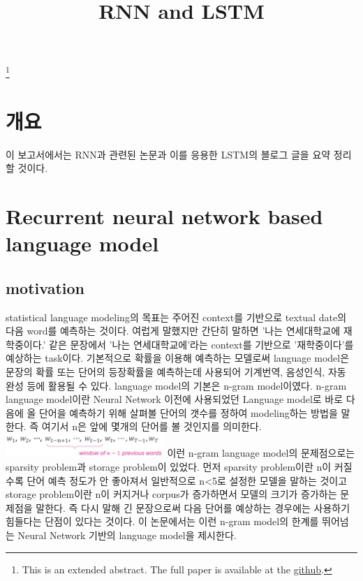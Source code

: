 \documentclass[extendedabs]{bmvc2k}
\begin{document}
\title{RNN and LSTM}
\maketitle
\let\thefootnote\relax\footnote{This is an extended abstract. The full paper is available at the \href{https://github.com/LeeGwanHui/TIL/tree/main/deeplearning_ham}{github}. }
\vspace{-0.2in}
\section{개요}
 \quad 이 보고서에서는 RNN과 관련된 논문과 이를 응용한 LSTM의 블로그 글을 요약 정리할 것이다.

 \section{Recurrent neural network based language model\cite{mikolov2010recurrent}}
 \subsection{motivation}
 \quad statistical language modeling의 목표는 주어진 context를 기반으로 textual date의 다음 word를 예측하는 것이다. 
 여럽게 말했지만 간단히 말하면 '나는 연세대학교에 재학중이다.' 같은 문장에서 '나는 연세대학교에'라는 context를 기반으로 '재학중이다'를 예상하는 task이다.
 기본적으로 확률을 이용해 예측하는 모델로써 language model은 문장의 확률 또는 단어의 등장확률을 예측하는데 사용되어
 기계번역, 음성인식, 자동 완성 등에 활용될 수 있다. \cite{youtube} language model의 기본은 n-gram model이였다. 
 n-gram language model이란 Neural Network 이전에 사용되었던 Language model로 바로 다음에 올 단어을 예측하기 위해 살펴볼 
 단어의 갯수를 정하여 modeling하는 방법을 말한다. 즉 여기서 n은 앞에 몇개의 단어를 볼 것인지를 의미한다.
 \newline  \includegraphics[width=6cm]{images/06_language.PNG}
 \newline 이런 n-gram language model의 문제점으로는 sparsity problem과 storage problem이 있었다. 먼저 sparsity problem이란 
 n이 커질수록 단어 예측 정도가 안 좋아져서 일반적으로 n<5로 설정한 모델을 말하는 것이고 storage problem이란 n이 커지거나 corpus가 증가하면서 모델의
 크기가 증가하는 문제점을 말한다. 즉 다시 말해 긴 문장으로써 다음 단어를 예상하는 경우에는 사용하기 힘들다는 단점이 있다는 것이다.
 이 논문에서는 이런 n-gram model의 한계를 뛰어넘는 Neural Network 기반의 language model을 제시한다.
\end{document}
